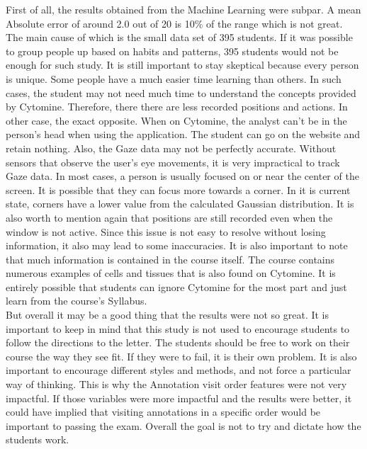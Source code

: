 \documentclass[a4paper,11pt]{report}
\numberwithin{figure}{section} %
\begin{document}
        First of all, the results obtained from the Machine Learning were subpar.
        A mean Absolute error of around 2.0 out of 20 is 10\% of the range which is not great.
        The main cause of which is the small data set of 395 students.
        If it was possible to group people up based on habits and patterns, 395 students would not be enough for such study.
        It is still important to stay skeptical because every person is unique.
        Some people have a much easier time learning than others.
        In such cases, the student may not need much time to understand the concepts provided by Cytomine.
        Therefore, there there are less recorded positions and actions.
        In other case, the exact opposite.
        When on Cytomine, the analyst can't be in the person's head when using the application.
        The student can go on the website and retain nothing.
        Also, the Gaze data may not be perfectly accurate.
        Without sensors that observe the user's eye movements, it is very impractical to track Gaze data.
        In most cases, a person is usually focused on or near the center of the screen.
        It is possible that they can focus more towards a corner.
        In it is current state, corners have a lower value from the calculated Gaussian distribution.
        It is also worth to mention again that positions are still recorded even when the window is not active.
        Since this issue is not easy to resolve without losing information, it also may lead to some inaccuracies.
        It is also important to note that much information is contained in the course itself.
        The course contains numerous examples of cells and tissues that is also found on Cytomine.
        It is entirely possible that students can ignore Cytomine for the most part and just learn from the course's Syllabus.\\


        But overall it may be a good thing that the results were not so great.
        It is important to keep in mind that this study is not used to encourage students to follow the directions to the letter.
        The students should be free to work on their course the way they see fit.
        If they were to fail, it is their own problem.
        It is also important to encourage different styles and methods, and not force a particular way of thinking.
        This is why the Annotation visit order features were not very impactful.
        If those variables were more impactful and the results were better, it could have implied that visiting annotations in a specific order would be important to passing the exam.
        Overall the goal is not to try and dictate how the students work.\\
\end{document}
